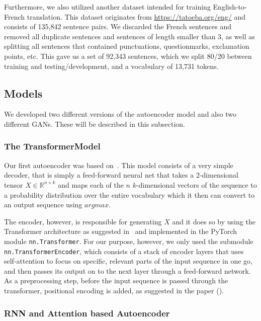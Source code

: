 \documentclass{article}
\begin{document}
Furthermore, we also utilized another dataset intended for training
English-to-French translation. This dataset originates from
\url{https://tatoeba.org/eng/} and consists of 135,842 sentence pairs. We
discarded the French sentences and removed all duplicate sentences and sentences
of length smaller than 3, as well as splitting all sentences that contained
punctuations, questionmarks, exclamation points, etc. This gave us a set of
92,343 sentences, which we split 80/20 between training and testing/development,
and a vocabulary of 13,731 tokens.


\subsection{Models}\label{sec:models}

We developed two different versions of the autoencoder model and also two
different GANs. These will be described in this subsection.

\subsubsection{The TransformerModel}\label{sec:transformermodel}

Our first autoencoder was based on~\cite{pytorchTutorialTransformer}. This model
consists of a very simple decoder, that is simply a feed-forward neural net that
takes a 2-dimensional tensor $X \in \mathbb{R}^{n \times k}$ and maps each of
the $n$ $k$-dimensional vectors of the sequence to a probability distribution
over the entire vocabulary which it then can convert to an output sequence using
$argmax$.

The encoder, however, is responsible for generating $X$ and it does so by using
the Transformer architecture as suggested in~\cite{vaswani2017attention} and
implemented in the PyTorch module \texttt{nn.Transformer}. For our purpose,
however, we only used the submodule \texttt{nn.TransformerEncoder}, which
consists of a stack of encoder layers that uses self-attention to focus on
specific, relevant parts of the input sequence in one go, and then passes its
output on to the next layer through a feed-forward network. As a preprocessing
step, before the input sequence is passed through the transformer, positional
encoding is added, as suggested in the paper (\cite{vaswani2017attention}).


\subsubsection{RNN and Attention based Autoencoder}\label{sec:attnRNN}
\end{document}
